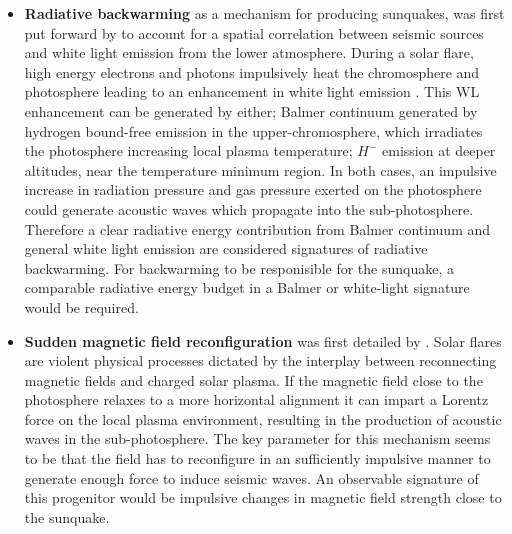{\begin{itemize}
\item \textbf{Radiative backwarming} as a mechanism for producing sunquakes, was first put forward by \cite{2005ApJ...630.1168D} to account for a spatial correlation between seismic sources and white light emission from the lower atmosphere. During a solar flare, high energy electrons and photons impulsively heat the chromosphere and photosphere leading to an enhancement in white light emission \citep{1989SoPh..124..303M}. This WL enhancement can be generated by either; Balmer continuum generated by hydrogen bound-free emission in the upper-chromosphere, which irradiates the photosphere increasing local plasma temperature; $H^{-}$ emission at deeper altitudes, near the temperature minimum region. In both cases, an impulsive increase in radiation pressure and gas pressure exerted on the photosphere could generate acoustic waves which propagate into the sub-photosphere. Therefore a clear radiative energy contribution from Balmer continuum and general white light emission are considered signatures of radiative backwarming. For backwarming to be responisible for the sunquake, a comparable radiative energy budget in a Balmer or white-light signature would be required.\\

\item \textbf{Sudden magnetic field reconfiguration} was first detailed by \cite{2008ASPC..383..221H}. Solar flares are violent physical processes dictated by the interplay between reconnecting magnetic fields and charged solar plasma.
If the magnetic field close to the photosphere relaxes to a more horizontal alignment it can impart a Lorentz force on the local plasma environment, resulting in the production of acoustic waves in the sub-photosphere. The key parameter for this mechanism seems to be that the field has to reconfigure in an sufficiently impulsive manner to generate enough force to induce seismic waves. An observable signature of this progenitor would be impulsive changes in magnetic field strength close to the sunquake. \\


\end{itemize}}
